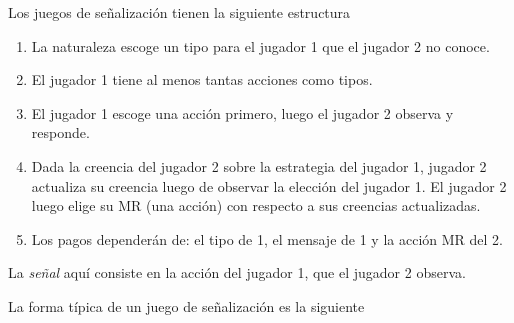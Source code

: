 \documentclass[12pt]{article}
\begin{document}
Los juegos de señalización tienen la siguiente estructura

\begin{enumerate}
	\setlength{\itemsep}{0pt}
	\setlength{\parskip}{0pt}
	\setlength{\parsep}{0pt}
	\item La naturaleza escoge un tipo para el jugador 1 que el jugador 2 no conoce.
	\item El jugador 1 tiene al menos tantas acciones como tipos.
	\item El jugador 1 escoge una acción primero, luego el jugador 2 observa y responde.
	\item Dada la creencia del jugador 2 sobre la estrategia del jugador 1, jugador 2 actualiza su creencia luego de observar la elección del jugador 1. El jugador 2 luego elige su MR (una acción) con respecto a sus creencias actualizadas.
	\item Los pagos dependerán de: el tipo de 1, el mensaje de 1 y la acción MR del 2.
\end{enumerate}

La \textit{señal} aquí consiste en la acción del jugador 1, que el jugador 2 observa.

La forma típica de un juego de señalización es la siguiente
\end{document}
